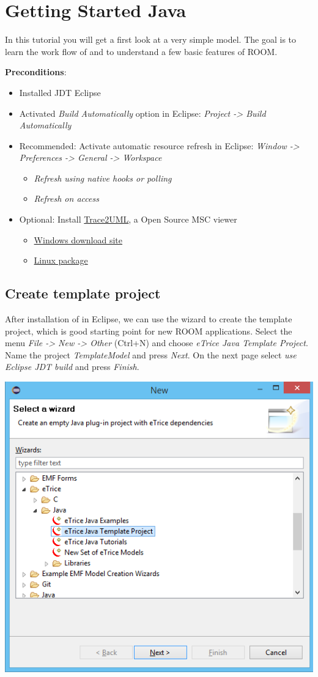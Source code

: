 \section{Getting Started Java}

In this tutorial you will get a first look at a very simple \eTrice{} model. The goal is to learn the work flow of \eTrice{} and to understand a few basic features of ROOM.

\textbf{Preconditions}:
\begin{itemize}
	\item Installed JDT Eclipse
	\item Activated \emph{Build Automatically} option in Eclipse: \emph{Project -> Build Automatically}
	\item Recommended: Activate automatic resource refresh in Eclipse: \emph{Window -> Preferences -> General -> Workspace}
	\begin{itemize}
		\item \emph{Refresh using native hooks or polling}
		\item \emph{Refresh on access}
	\end{itemize}
	\item Optional: Install \href{http://trace2uml.stage.tigris.org/}{Trace2UML}, a Open Source MSC viewer
	\begin{itemize}
		\item \href{http://trace2uml.tigris.org/servlets/ProjectDocumentList?folderID=6208}{Windows download site}
		\item \href{http://apt.astade.de/}{Linux package}
	\end{itemize}
	
\end{itemize}

\subsection{Create template project}
After installation of \eTrice in Eclipse, we can use the wizard to create the template project, which is good starting point for new ROOM applications. Select the menu \emph{File -> New -> Other} (Ctrl+N) and choose \emph{eTrice Java Template Project}. Name the project \emph{TemplateModel} and press \emph{Next}. On the next page select \emph{use Eclipse JDT build} and press \emph{Finish}.

\includegraphics[width=.5\textwidth]{images/014-wizard.png}


